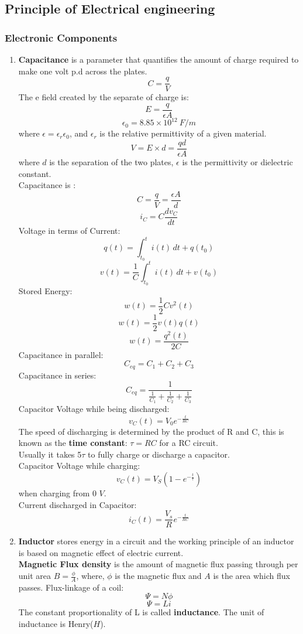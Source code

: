 \subsection{Principle of Electrical engineering}
\subsubsection{Electronic Components}
\begin{enumerate}
    \item \textbf{Capacitance} is a parameter that quantifies the amount of charge required to make one volt p.d across the plates.
\[C=\frac{q}{V}\]
The e field created by the separate of charge is:
\[E=\frac{q}{\epsilon A}\] 
\[\epsilon_0 =8.85\times10^12\ F/m\]
where $\epsilon = \epsilon_r \epsilon_0$, and $\epsilon_r$ is the relative permittivity of a given material. 
\[V=E\times d=\frac{qd}{\epsilon A}\]
where $d$ is the separation of the two plates, $\epsilon$ is the permittivity or dielectric constant.\\
Capacitance is :
\[C=\frac{q}{V}=\frac{\epsilon A}{d}\]
\[i_C = C\frac{dv_C}{dt}\]
Voltage in terms of Current:
\[q(t)=\int^t_{t_0}{i(t)\, dt+q(t_0)}\]
\[v(t)=\frac{1}{C}\int^t_{t_0}{i(t)\, dt+v(t_0)}\]
Stored Energy:
\[w(t)=\frac{1}{2}Cv^2(t)\]
\[w(t)=\frac{1}{2}v(t)q(t)\]
\[w(t)=\frac{q^2(t)}{2C}\]
Capacitance in parallel:
\[C_{eq} = C_1+C_2+C_3\]
Capacitance in series:
\[C_{eq}=\frac{1}{\frac{1}{C_1}+\frac{1}{C_2}+\frac{1}{C_3}}\]
Capacitor Voltage while being discharged:
\[v_{C}(t)=V_0e^{-\frac{t}{RC}}\]
The speed of discharging is determined by the product of R and C, this is known as the \textbf{time constant}: $\tau=RC$ for a RC circuit.\\
Usually it takes 5$\tau$ to fully charge or discharge a capacitor.\\
Capacitor Voltage while charging:
\[v_{C}(t)=V_S(1-e^{-\frac{t}{\tau}})\] when charging from 0 $V$.\\
Current discharged in Capacitor:
\[i_C(t)=\frac{V_s}{R}e^{-\frac{t}{RC}}\]
    \item \textbf{Inductor} stores energy in a circuit and the working principle of an inductor is based on magnetic effect of electric current.\\
\textbf{Magnetic Flux density} is the amount of magnetic flux passing through per unit area $B = \frac{\phi}{A}$, where, $\phi$ is the magnetic flux and $A$ is the area which flux passes.
Flux-linkage of a coil:
\[\Psi = N\phi\]
\[\Psi = Li\]
The constant proportionality of L is called \textbf{inductance}. The unit of inductance is Henry($H$). \\

\end{enumerate}
